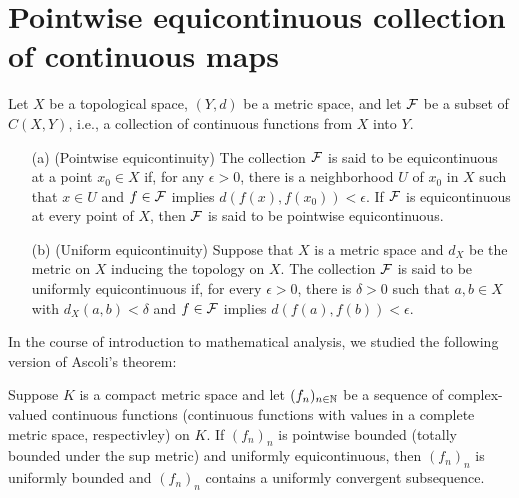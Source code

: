 \section{Pointwise equicontinuous collection of continuous maps}

\begin{defi}[Equicontinuity]
    Let $X$ be a topological space, $(Y, d)$ be a metric space, and let ${\mathcal{F}}$ be a subset of $C(X, Y)$, i.e., a collection of continuous functions from $X$ into $Y$.
    \begin{enumerate}
        \item[(a)]
        {
            (Pointwise equicontinuity)
            The collection ${\mathcal{F}}$ is said to be equicontinuous at a point $x_0\in X$ if, for any $\epsilon>0$, there is a neighborhood $U$ of $x_0$ in $X$ such that $x\in U$ and $f\in{\mathcal{F}}$ implies $d(f(x), f(x_0))<\epsilon$.
            If ${\mathcal{F}}$ is equicontinuous at every point of $X$, then ${\mathcal{F}}$ is said to be pointwise equicontinuous.
        }
        \item[(b)]
        {
            (Uniform equicontinuity)
            Suppose that $X$ is a metric space and $d_X$ be the metric on $X$ inducing the topology on $X$.
            The collection ${\mathcal{F}}$ is said to be uniformly equicontinuous if, for every $\epsilon>0$, there is $\delta>0$ such that $a, b\in X$ with $d_X(a, b)<\delta$ and $f\in{\mathcal{F}}$ implies $d(f(a), f(b))<\epsilon$.
        }
    \end{enumerate}
\end{defi}
\begin{rmk}
    In the course of introduction to mathematical analysis, we studied the following version of Ascoli's theorem:
    \begin{center}
        Suppose $K$ is a compact metric space and let $(f_n)_{n\in{\mathbb{N}}}$ be a sequence of complex-valued continuous functions (continuous functions with values in a complete metric space, respectivley) on $K$.
        If $(f_n)_n$ is pointwise bounded (totally bounded under the sup metric) and uniformly equicontinuous, then $(f_n)_n$ is uniformly bounded and $(f_n)_n$ contains a uniformly convergent subsequence.
    \end{center}
\end{rmk}

